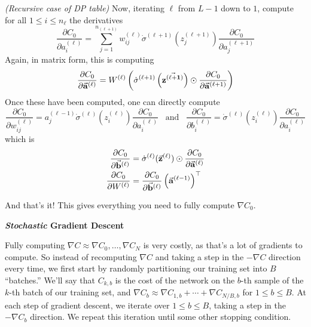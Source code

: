 \emph{(Recursive case of DP table)} Now, iterating $\ell$ from $L - 1$ down to $1$, compute for all $1 \leq i \leq n_\ell$ the derivatives 
\[
    \frac{\partial C_0}{\partial a_i^{(\ell)}} = \sum_{j = 1}^{n_{(\ell + 1)}} w_{ij}^{(\ell)} \dot\sigma^{(\ell + 1)}(z_j^{(\ell + 1)}) \frac{\partial C_0}{\partial a_j^{(\ell + 1)}}
\]
Again, in matrix form, this is computing 
\[
    \frac{\partial C_0}{\partial \vec{\mathbf{a}}^{(\ell)}} = W^{(\ell)} \left(\dot\sigma^{(\ell + 1)}\left(\vec{\mathbf{z^{(\ell + 1)}}}\right) \odot \frac{\partial C_0}{\partial \vec{\mathbf{a}}^{(\ell + 1)}}\right)
\]
Once these have been computed, one can directly compute
\[
    \frac{\partial C_0}{\partial w_{ij}^{(\ell)}} = a_j^{(\ell - 1)} \dot\sigma^{(\ell)}(z_i^{(\ell)}) \frac{\partial C_0}{\partial a_i^{(\ell)}} \;\;\; \text{and} \;\;\; \frac{\partial C_0}{\partial b_i^{(\ell)}} = \dot\sigma^{(\ell)}(z_i^{(\ell)}) \frac{\partial C_0}{\partial a_i^{(\ell)}}
\]
which is 
\begin{align*}
    \frac{\partial C_0}{\partial \vec{\mathbf{b}}^{(\ell)}} &= \dot\sigma^{(\ell)}(\vec{\mathbf{z}}^{(\ell)}) \odot \frac{\partial C_0}{\partial \vec{\mathbf{a}}^{(\ell)}} \\
    \frac{\partial C_0}{\partial W^{(\ell)}}        &= \frac{\partial C_0}{\partial \vec{\mathbf{b}}^{(\ell)}} \left(\vec{\mathbf{a}}^{(\ell - 1)}\right)^\top
\end{align*}

And that's it! This gives everything you need to fully compute $\nabla C_0$.

\begin{center}
    \textbf{\emph{Stochastic} Gradient Descent}
\end{center}

Fully computing $\nabla C \approx \nabla C_0, \ldots, \nabla C_N$ is very costly, as that's a lot of gradients to compute. So instead 
of recomputing $\nabla C$ and taking a step in the $-\nabla C$ direction every time, we first start by randomly partitioning 
our training set into $B$ ``batches.'' We'll say that $C_{k, b}$ is the cost of the network on the $b$-th sample of the $k$-th 
batch of our training set, and $\nabla C_b \approx \nabla C_{1, b} + \cdots + \nabla C_{N/B, b}$ for $1 \leq b \leq B$. 
At each step of gradient descent, we iterate over $1 \leq b \leq B$, taking a step in the $-\nabla C_b$ direction. 
We repeat this iteration until some other stopping condition.